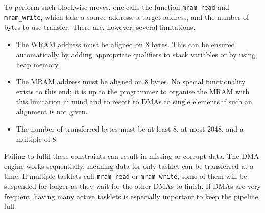 To perform such blockwise moves, one calls the \langC{} function \lstinline|mram_read| and \lstinline|mram_write|, which take a source address, a target address, and the number of bytes to use transfer.
There are, however, several limitations.
\begin{itemize}
	\item
	The \ac{WRAM} address must be aligned on 8 bytes.
	This can be ensured automatically by adding appropriate qualifiers to stack variables or by using heap memory.

	\item
	The \ac{MRAM} address must be aligned on 8 bytes.
	No special functionality exists to this end;
	it is up to the programmer to organise the \ac{MRAM} with this limitation in mind and to resort to \acp{DMA} to single elements if such an alignment is not given.

	\item
	The number of transferred bytes must be at least 8, at most 2048, and a multiple of 8.
\end{itemize}
Failing to fulfil these constraints can result in missing or corrupt data.
The \ac{DMA} engine works sequentially, meaning data for only tasklet can be transferred at a time.
If multiple tasklets call \lstinline|mram_read| or \lstinline|mram_write|, some of them will be suspended for longer as they wait for the other \acp{DMA} to finish.
If \acp{DMA} are very frequent, having many active tasklets is especially important to keep the pipeline full.
